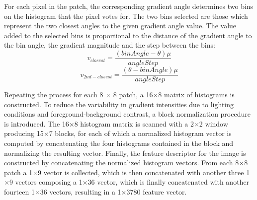 \documentclass[journal,twocolumn]{IEEEtran}
\begin{document}
For each pixel in the patch, the corresponding gradient angle
determines two bins on the histogram that the pixel votes for.
The two bins selected are those which represent the two closest
angles to the given gradient angle value. The value added to
the selected bins is proportional to the distance of the gradient
angle to the bin angle, the gradient magnitude and the step
between the bins:
\begin{equation*}
v_{closest}=\frac{(binAngle-\theta)\mu}{angleStep}
\end{equation*}
\begin{equation*}
v_{2nd-closest}=\frac{(\theta-binAngle)\mu}{angleStep}
\end{equation*}

Repeating the process for each 8 × 8 patch, a 16$\times$8 matrix
of histograms is constructed.
To reduce the variability in gradient intensities due to lighting conditions and foreground-background contrast, a block
normalization procedure is introduced. The 16$\times$8 histogram
matrix is scanned with a 2$\times$2 window producing 15$\times$7 blocks,
for each of which a normalized histogram vector is computed
by concatenating the four histograms contained in the block
and normalizing the resulting vector.
Finally, the feature descriptor for the image is constructed
by concatenating the normalized histogram vectors. From
each 8$\times$8 patch a 1$\times$9 vector is collected, which is then
concatenated with another three 1$\times$9 vectors composing a
1$\times$36 vector, which is finally concatenated with another
fourteen 1$\times$36 vectors, resulting in a 1$\times$3780 feature vector.
\end{document}
